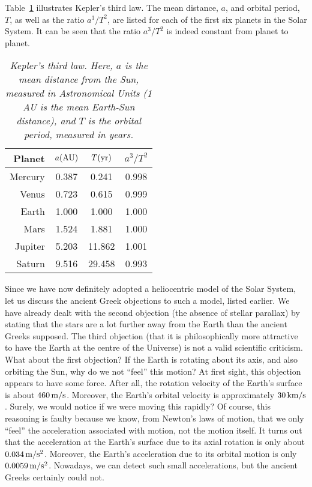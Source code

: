 Table~\ref{tkepler} illustrates Kepler's third law. The mean distance, $a$,  and orbital period, $T$,  as well as the ratio $a^3/T^2$,
are listed for each of the first six planets in the Solar System. It can be seen that the ratio
$a^3/T^2$ is indeed  constant from planet to planet.

\begin{table}
\centering
\begin{tabular}{r|ccc}
Planet & $a({\rm AU})$ & $T({\rm yr})$ & $a^3/T^2$\\[0.5ex] \hline
Mercury & 0.387 & 0.241 & 0.998 \\[0.5ex]
Venus & 0.723 & 0.615 &  0.999 \\[0.5ex]
Earth & 1.000 & 1.000 &  1.000\\ [0.5ex]
Mars & 1.524 & 1.881 &  1.000 \\[0.5ex]
Jupiter & 5.203 & 11.862 &1.001\\ [0.5ex]
Saturn & 9.516 & 29.458 & 0.993\\
\end{tabular}
\caption{\em Kepler's third law. Here, $a$ is the mean distance from the Sun, measured in Astronomical Units (1 AU is the
mean Earth-Sun distance), and $T$ is the orbital period, measured in years.}\label{tkepler}
\end{table}

Since we have now definitely adopted a heliocentric model of the Solar System, let us
discuss the ancient Greek objections to such a model, listed earlier. We have already
dealt with the second objection (the absence of stellar parallax) by stating that the
stars are a lot further away from the Earth than the ancient Greeks supposed. The
third objection (that it is philosophically more attractive to have the Earth
at the centre of the Universe) is not a valid scientific criticism. What about the
first objection? If the Earth is rotating about its axis, and also orbiting
the Sun, why do we not ``feel'' this motion? At first sight, this objection appears
to have some force. After all, the rotation velocity of the Earth's surface 
is about $460\,{\rm m/s}$. Moreover, the Earth's orbital velocity is approximately
$30\,{\rm km/s}$. Surely, we would notice if we were moving this rapidly? Of course,
this reasoning is faulty because we know, from Newton's laws of motion, that we only
``feel'' the acceleration associated with motion, not the motion itself. It turns
out that the acceleration at the Earth's surface due to its axial rotation is only about
$0.034\,{\rm m/s^2}$. Moreover, the Earth's acceleration due to its orbital motion
is only $0.0059\,{\rm m/s^2}$. Nowadays, we can detect such small accelerations, but the
ancient Greeks certainly could not.

